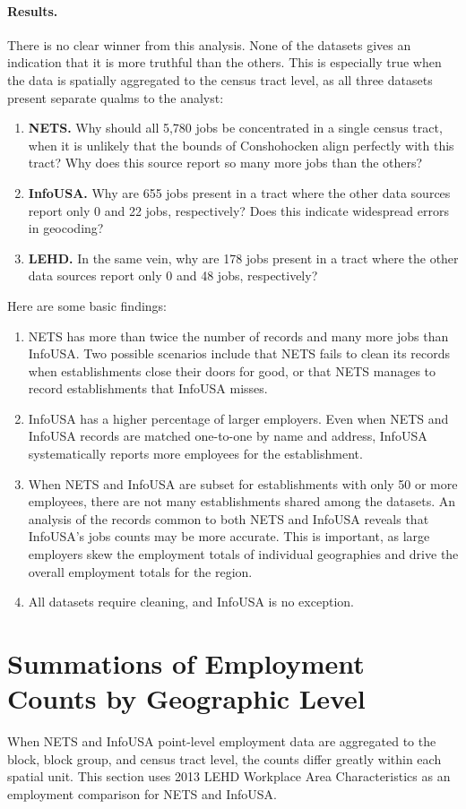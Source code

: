 \documentclass[paper = letter, fontsize = 11pt]{scrartcl}
\begin{document}
\paragraph{Results.} There is no clear winner from this analysis. None of the datasets gives an indication that it is more truthful than the others. This is especially true when the data is spatially aggregated to the census tract level, as all three datasets present separate qualms to the analyst:
\begin{enumerate}
	\item \textbf{NETS.} Why should all 5,780 jobs be concentrated in a single census tract, when it is unlikely that the bounds of Conshohocken align perfectly with this tract? Why does this source report so many more jobs than the others?
	\item \textbf{InfoUSA.} Why are 655 jobs present in a tract where the other data sources report only 0 and 22 jobs, respectively? Does this indicate widespread errors in geocoding?
	\item \textbf{LEHD.} In the same vein, why are 178 jobs present in a tract where the other data sources report only 0 and 48 jobs, respectively?
\end{enumerate}
Here are some basic findings:
\begin{enumerate}
	\item NETS has more than twice the number of records and many more jobs than InfoUSA. Two possible scenarios include that NETS fails to clean its records when establishments close their doors for good, or that NETS manages to record establishments that InfoUSA misses.
	\item InfoUSA has a higher percentage of larger employers. Even when NETS and InfoUSA records are matched one-to-one by name and address, InfoUSA systematically reports more employees for the establishment.
	\item When NETS and InfoUSA are subset for establishments with only 50 or more employees, there are not many establishments shared among the datasets. An analysis of the records common to both NETS and InfoUSA reveals that InfoUSA's jobs counts may be more accurate. This is important, as large employers skew the employment totals of individual geographies and drive the overall employment totals for the region.
	\item All datasets require cleaning, and InfoUSA is no exception.
\end{enumerate}

\section{Summations of Employment Counts by Geographic Level}
When NETS and InfoUSA point-level employment data are aggregated to the block, block group, and census tract level, the counts differ greatly within each spatial unit. This section uses 2013 LEHD Workplace Area Characteristics as an employment comparison for NETS and InfoUSA.
\end{document}

